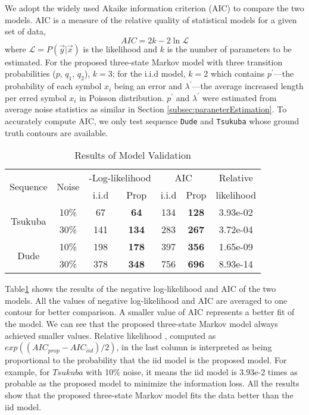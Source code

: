 We adopt the widely used Akaike information criterion (AIC) \cite{akaike1974new} to compare the two models.
AIC is a measure of the relative quality of statistical models for a given set of data,
\begin{equation}
AIC = 2k - 2\ln {\mathcal{L}}
\label{eq:AIC}
\end{equation}
where $\mathcal{L}=P(\vec{y}|\vec{x})$ is the likelihood and $k$ is the number of parameters to be estimated.
For the proposed three-state Markov model with three transition probabilities ($p$, $q_1$, $q_2$), $k = 3$; for the i.i.d model, $k=2$ which contains $p^{\prime}$---the probability of each symbol $x_i$ being an error and $\lambda^{\prime}$---the average increased length per erred symbol $x_i$ in Poisson distribution.
$p^{\prime}$ and $\lambda^{\prime}$ were estimated from average noise statistics as similar in Section \ref{subsec:paraneterEstimation}.
To accurately compute AIC, we only test sequence \texttt{Dude} and \texttt{Tsukuba} whose ground truth contours are available.

\begin{table}
\caption{Results of Model Validation}
\label{tab:model_validation}

\begin{tabular}{c|c|c|c|c|c|c}
\hline 
\hline
\multirow{2}{*}{Sequence} & \multirow{2}{*}{Noise} & \multicolumn{2}{c|}{-Log-likelihood} & \multicolumn{2}{c|}{AIC} & \multicolumn{1}{c}{Relative }\tabularnewline
\cline{3-6} 
 &  & i.i.d & Prop & i.i.d & Prop & likelihood\tabularnewline
\hline 
\multirow{2}{*}{Tsukuba} & 10\% & 67 & \textbf{64 } & 134  & \textbf{128 } & 3.93e-02 \tabularnewline
\cline{2-7} 
 & 30\% & 141  & \textbf{134 } & 283  & \textbf{267 } & 3.72e-04 \tabularnewline
\hline 
\multirow{2}{*}{Dude} & 10\% & 198  & \textbf{178 } & 397  & \textbf{356 } & 1.65e-09 \tabularnewline
\cline{2-7} 
 & 30\% & 378 & \textbf{348 } & 756  & \textbf{696 } & 8.93e-14 \tabularnewline
\hline 
\hline
\end{tabular}

\end{table}

Table\;\ref{tab:model_validation} shows the results of the negative log-likelihood and AIC of the two models.
All the values of negative log-likelihood and AIC are averaged to one contour for better comparison. 
A smaller value of AIC represents a better fit of the model.
We can see that the proposed three-state Markov model always achieved smaller values.
Relative likelihood \cite{burnham2003model}, computed as $exp((AIC_{prop}-AIC_{iid})/2)$, in the last column is interpreted as being proportional to the probability that the iid model is the proposed model.
For example, for $Tsukuba$ with 10\% noise, it means the iid model is 3.93e-2 times as probable as the proposed model to minimize the information loss.
All the results show that the proposed three-state Markov model fits the data better than the iid model.

